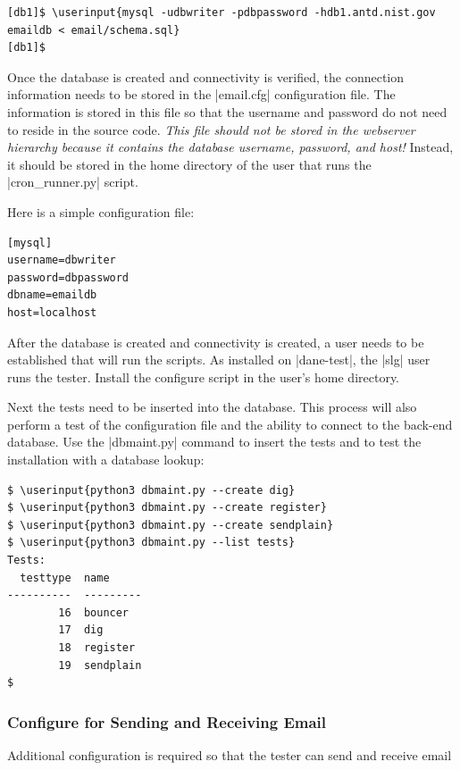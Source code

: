 \documentclass[preprint,3p,11pt]{elsarticle}
\newcommand\userinput[1]{\textbf{#1}}
\begin{document}
\begin{Verbatim}[commandchars=\\\{\}]
[db1]$ \userinput{mysql -udbwriter -pdbpassword -hdb1.antd.nist.gov emaildb < email/schema.sql}
[db1]$
\end{Verbatim}

Once the database is created and connectivity is verified, the
connection information needs to be stored in the 
|email.cfg| configuration file. The information is stored in this file
so that the username and password do not need to reside in the source
code. \emph{This file should not be stored in the webserver
  hierarchy because it contains the database username, password, and
  host!} Instead, it should be stored in the home directory of the
user that runs the |cron_runner.py| script.

Here is a simple configuration file:

\begin{lstlisting}
[mysql]
username=dbwriter
password=dbpassword
dbname=emaildb
host=localhost
\end{lstlisting}

After the database is created and connectivity is created, a user
needs to be established that will run the scripts. As installed on
|dane-test|, the |slg| user runs the tester.   Install the configure
script in the user's home directory.

Next the tests need to be inserted into the database. This process
will also perform a test of the configuration file and the ability to
connect to the back-end database. Use the |dbmaint.py| command to
insert the tests and to test the installation with a database lookup:

\begin{Verbatim}[commandchars=\\\{\}]
$ \userinput{python3 dbmaint.py --create dig}
$ \userinput{python3 dbmaint.py --create register}
$ \userinput{python3 dbmaint.py --create sendplain}
$ \userinput{python3 dbmaint.py --list tests}
Tests:
  testtype  name
----------  ---------
        16  bouncer
        17  dig
        18  register
        19  sendplain
$
\end{Verbatim}

\subsubsection{Configure for Sending and Receiving Email}

Additional configuration is required so that the tester can send and receive email
\end{document}
